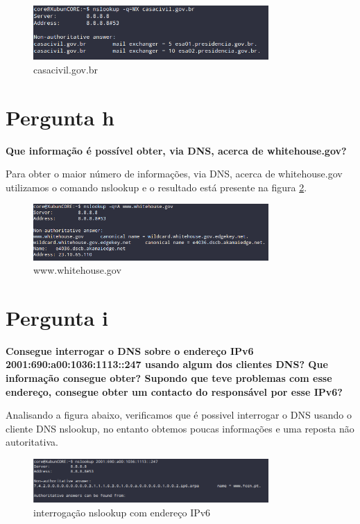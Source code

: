 \documentclass[a4paper]{report}
\begin{document}
\begin{figure}[H]
    \centering 
    \includegraphics[width=0.8\textwidth]{images/casacivil_gov_br.png}  
    \caption{casacivil.gov.br}
    \label{fig:casacivil.gov.br}
\end{figure}

\section{Pergunta h}
\textbf{Que informação é possível obter, via DNS, acerca de whitehouse.gov?}

Para obter o maior número de informações, via DNS, acerca de whitehouse.gov
utilizamos o comando nslookup e o resultado está presente na figura 
\ref{fig:www.whitehouse.gov}.

\begin{figure}[H]
    \centering 
    \includegraphics[width=0.8\textwidth]{images/withehouse_gov.png}  
    \caption{www.whitehouse.gov}
    \label{fig:www.whitehouse.gov}
\end{figure}

\section{Pergunta i}
\textbf{Consegue interrogar o DNS sobre o endereço IPv6
2001:690:a00:1036:1113::247 usando algum dos clientes DNS? Que informação
consegue obter? Supondo que teve problemas com esse endereço, consegue obter um
contacto do responsável por esse IPv6?}

Analisando a figura abaixo, verificamos que é possivel interrogar o DNS usando o
cliente DNS nslookup, no entanto obtemos poucas informações e uma reposta não
autoritativa.

\begin{figure}[H]
    \centering 
    \includegraphics[width=0.8\textwidth]{images/nslookup_ipv6.png}  
    \caption{interrogação nslookup com endereço IPv6}
    \label{fig:nslookup_ipv6}
\end{figure}
\end{document}
